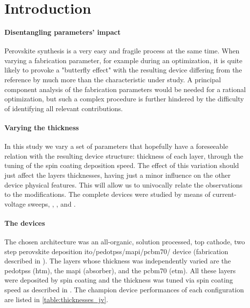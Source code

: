 

\section{Introduction}

	\paragraph{Disentangling parameters' impact}
	Perovskite synthesis is a very easy and fragile process at the same time. When varying a fabrication parameter, for example during an optimization, it is quite likely to provoke a "butterfly effect" with the resulting device differing from the reference by much more than the characteristic under study.
	A principal component analysis of the fabrication parameters would be needed for a rational optimization, but such a complex procedure is further hindered by the difficulty of identifying all relevant contributions.

	\paragraph{Varying the thickness}
	In this study we vary a set of parameters that hopefully have a foreseeable relation with the resulting device structure: thickness of each layer, through the tuning of the spin coating deposition speed.
	The effect of this variation should just affect the layers thicknesses, having just a minor influence on the other device physical features.
	This will allow us to univocally relate the observations to the modifications.
	The complete devices were studied by means of current-voltage sweeps, , , and .

	\paragraph{The devices}
	The chosen architecture was an all-organic, solution processed, top cathode, two step perovskite deposition \gls{ito}\-/\gls{pedotpss}\-/\gls{mapi}\-/\gls{pcbm70}\-/ device (fabrication described in ).
	The layers whose thickness was independently varied are the \gls{pedotpss} (\gls{htm}), the \gls{mapi} (absorber), and the \gls{pcbm70} (\gls{etm}).
All these layers were deposited by spin coating and the thickness was tuned via spin coating speed as described in .
The champion device performances of each configuration are listed in \cref{table:thicknesses_jv}.

